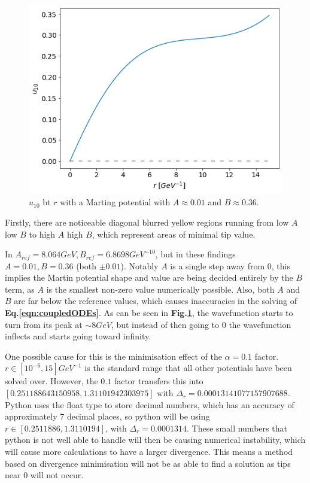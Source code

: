 \documentclass[10pt,twocolumn]{revtex4}    %
\begin{document}
\begin{figure}[t]
    \centering
    \includegraphics[width=\linewidth]{MartinBetaSpectra.png}
    \caption{$u_{10}$ bt $r$ with a Marting potential with $A \approx 0.01$ and $B \approx 0.36$.}
    \label{fig:martinSpectra}
\end{figure}

Firstly, there are noticeable diagonal blurred yellow regions running from low $A$ low $B$ to high $A$ high $B$, which represent areas of minimal tip value. 

In \textbf{\cite{MartinPaper}} $A_{ref}=8.064GeV, B_{ref}=6.8698GeV^{-10}$, but in these findings $A=0.01, B=0.36$ (both $\pm0.01$). Notably $A$ is a single step away from $0$, this implies the Martin potential shape and value are being decided entirely by the $B$ term, as $A$ is the smallest non-zero value numerically possible. Also, both $A$ and $B$ are far below the reference values, which causes inaccuracies in the solving of \textbf{Eq.\ref{eqn:coupledODEs}}. As can be seen in \textbf{Fig.\ref{fig:martinSpectra}}, the wavefunction starts to turn from its peak at $\sim 8GeV$, but instead of then going to $0$ the wavefunction inflects and starts going toward infinity.

One possible cause for this is the minimisation effect of the $\alpha = 0.1$ factor. $r \in [10^{-6}, 15]GeV^{-1}$ is the standard range that all other potentials have been solved over. However, the $0.1$ factor transfers this into $[0.251188643150958, 1.31101942303975]$ with $\Delta_r = 0.00013141077157907688$. Python uses the float type to store decimal numbers, which has an accuracy of approximately 7 decimal places, so python will be using $r \in [0.2511886, 1.3110194]$, with $\Delta_r = 0.0001314$. These small numbers that python is not well able to handle will then be causing numerical instability, which will cause more calculations to have a larger divergence. This means a method based on divergence minimisation will not be as able to find a solution as tips near $0$ will not occur. 
\end{document}
